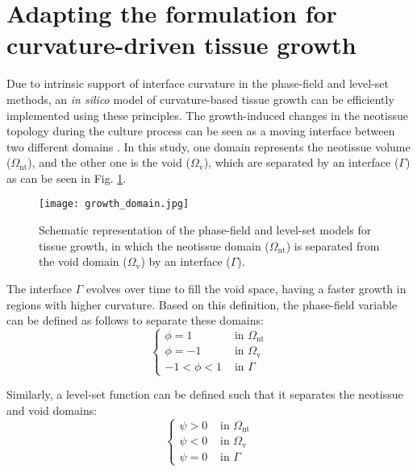 \section{Adapting the formulation for  curvature-driven tissue growth}

Due to intrinsic support of interface curvature in the phase-field and level-set methods, an \textit{in silico} model of curvature-based tissue growth can be efficiently implemented using these principles. The growth-induced changes in the neotissue topology during the culture process can be seen as a moving interface between two different domains \cite{Rumpler2008}. In this study, one domain represents the neotissue volume  ($\Omega_{\text{nt}}$), and the other one is the void ($\Omega_{\text{v}}$), which are separated by an interface ($\Gamma$) as can be seen in Fig. \ref{fig:growth_domain}.

\begin{figure}
\centering
\medskip
\texttt{[image: growth\_domain.jpg]}
\caption[Schematic representation of the phase-field and level-set models for tissue growth]{Schematic representation of the phase-field and level-set models for tissue growth, in which the neotissue domain ($\Omega_{\text{nt}}$) is separated from the void domain ($\Omega_{\text{v}}$) by an interface ($\Gamma$).}
\label{fig:growth_domain}
\end{figure}

The interface $\Gamma$ evolves over time to fill the void space, having a faster growth in regions with higher curvature. Based on this definition, the phase-field variable can be defined as follows to separate these domains:
\begin{equation} \label{eq:pf_domains}
\left\{\begin{array}{ll}
\phi = 1 & \text{ in } \Omega_{\text{nt}} \\
\phi = -1 & \text{ in } \Omega_{\text{v}} \\
-1 < \phi < 1 & \text{ in } \Gamma
\end{array}\right.
\end{equation}

Similarly, a level-set function can be defined such that it separates the neotissue and void domains:
\begin{equation} \label{eq:ls_domains}
\left\{\begin{array}{ll}
\psi > 0 & \text{ in } \Omega_{\text{nt}} \\
\psi < 0 & \text{ in } \Omega_{\text{v}} \\
\psi = 0 & \text{ in } \Gamma
\end{array}\right.
\end{equation}

